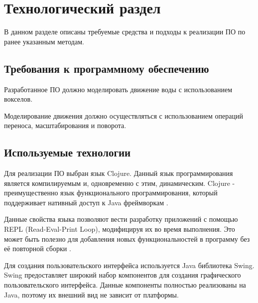 \chapter{Технологический раздел}
\label{cha:impl}

В данном разделе описаны требуемые средства и подходы к реализации ПО по ранее указанным методам.


\section{Требования к программному обеспечению}

Разработанное ПО должно моделировать движение воды с использованием вокселов.
%

Моделирование движения должно осуществляться с использованием операций переноса, масштабирования и поворота.

\section{Используемые технологии}

Для реализации ПО выбран язык Clojure. Данный язык программирования является
компилируемым и, одновременно с этим, динамическим. Clojure - преимущественно
язык функционального программирования, который поддерживает нативный доступ к
Java фреймворкам \cite{site:clojure}.

Данные свойства языка позволяют вести разработку приложений с помощью REPL
(Read-Eval-Print Loop), модифицируя их во время выполнения. Это может быть
полезно для добавления новых функциональностей в программу без её повторной сборки
\cite{site:repl}.

Для создания пользовательского интерфейса используется Java библиотека Swing.
Swing предоставляет широкий набор компонентов для создания графического пользовательского
интерфейса. Данные компоненты полностью реализованы на Java, поэтому их внешний вид не зависит
от платформы.

